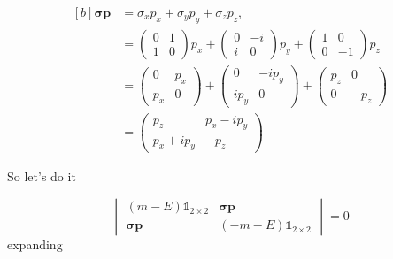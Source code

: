 \begin{equation}
\begin{aligned}[b]
    \bm{\sigma}\bm{p} & = \sigma_x p_x + \sigma_y p_y + \sigma_z p_z,\\
    &= \begin{pmatrix} 0 & 1 \\ 1 & 0 \end{pmatrix} p_x + 
    \begin{pmatrix} 0 & -i \\ i & 0 \end{pmatrix} p_y + \begin{pmatrix} 1 & 0 \\ 0 & -1 \end{pmatrix} p_z\\
    &= \begin{pmatrix} 0 & p_x \\ p_x & 0 \end{pmatrix} + 
    \begin{pmatrix} 0 & -i  p_y \\ i p_y & 0 \end{pmatrix}  + \begin{pmatrix} p_z & 0 \\ 0 & -p_z \end{pmatrix}\\
    &= \begin{pmatrix} p_z & p_x -i  p_y\\ p_x + ip_y & -p_z \end{pmatrix} 
\end{aligned}
\end{equation}

So let's do it

\begin{equation*}
    \begin{vmatrix}
     (m - E) \mathbb{1}_{2\times2} & \bm{\sigma}\bm{p}\\
      \bm{\sigma}\bm{p} & (-m -E)\mathbb{1}_{2\times2}
    \end{vmatrix} = 0
\end{equation*}
expanding

